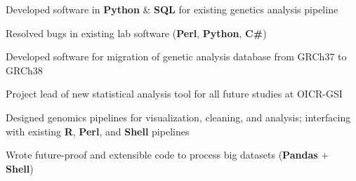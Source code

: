 \documentclass[]{chandan-cv}
\begin{document}
\begin{minipage}[t]{0.75\textwidth}
\begin{tightemize}
	\item Developed software in \textbf{Python} \& \textbf{SQL} for existing genetics analysis pipeline 
	\item Resolved bugs in existing lab software (\textbf{Perl}, \textbf{Python}, \textbf{C\#})
	\item Developed software for migration of genetic analysis database from GRCh37 to GRCh38
\end{tightemize}
\sectionsep


\end{minipage}

\newpage

\begin{minipage}[t]{0.77\textwidth}
\begin{tightemize}
	\item Project lead of new statistical analysis tool for all future studies at OICR-GSI
	\item Designed genomics pipelines for visualization, cleaning, and analysis; 
	interfacing with existing \textbf{R}, \textbf{Perl}, and \textbf{Shell} pipelines
	\item Wrote future-proof and extensible code to process big datasets (\textbf{Pandas} + \textbf{Shell})
\end{tightemize}
\sectionsep



\end{minipage}
\end{document}

